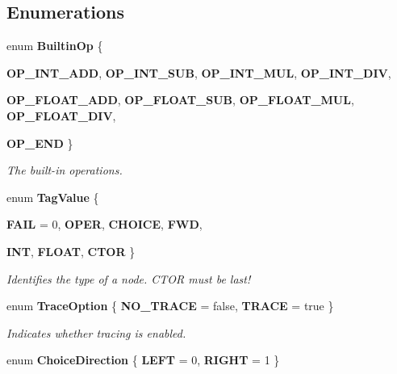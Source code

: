\subsection*{Enumerations}
\begin{CompactItemize}
\item 
enum {\bf Builtin\-Op} \{ \par
{\bf OP\_\-INT\_\-ADD}, 
{\bf OP\_\-INT\_\-SUB}, 
{\bf OP\_\-INT\_\-MUL}, 
{\bf OP\_\-INT\_\-DIV}, 
\par
{\bf OP\_\-FLOAT\_\-ADD}, 
{\bf OP\_\-FLOAT\_\-SUB}, 
{\bf OP\_\-FLOAT\_\-MUL}, 
{\bf OP\_\-FLOAT\_\-DIV}, 
\par
{\bf OP\_\-END}
 \}
\begin{CompactList}\small\item\em The built-in operations. \item\end{CompactList}\item 
enum {\bf Tag\-Value} \{ \par
{\bf FAIL} = 0, 
{\bf OPER}, 
{\bf CHOICE}, 
{\bf FWD}, 
\par
{\bf INT}, 
{\bf FLOAT}, 
{\bf CTOR}
 \}
\begin{CompactList}\small\item\em Identifies the type of a node. CTOR must be last! \item\end{CompactList}\item 
enum {\bf Trace\-Option} \{ {\bf NO\_\-TRACE} = false, 
{\bf TRACE} = true
 \}
\begin{CompactList}\small\item\em Indicates whether tracing is enabled. \item\end{CompactList}\item 
enum {\bf Choice\-Direction} \{ {\bf LEFT} = 0, 
{\bf RIGHT} = 1
 \}
\end{CompactItemize}
